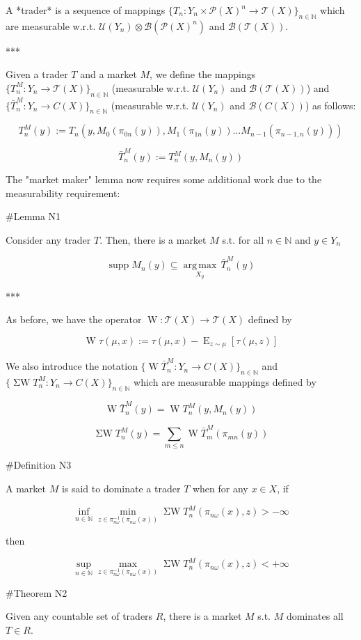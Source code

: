 \documentclass[a4paper]{article}
\DeclareMathOperator{\Supp}{supp}
\DeclareMathOperator{\E}{E}
\newcommand{\Argmax}[1]{\underset{#1}{\operatorname{arg\,max}}\,}
\newcommand{\Nats}{\mathbb{N}}
\newcommand{\Prob}{\mathcal{P}}
\newcommand{\T}{\mathcal{T}}
\newcommand{\B}{\mathcal{B}}
\newcommand{\UM}{\mathcal{U}}
\newcommand{\W}{\operatorname{W}}
\newcommand{\SW}{\operatorname{\Sigma W}}
\begin{document}
A *trader* is a sequence of mappings ${\{T_n: Y_n \times \Prob(X)^n \rightarrow \T(X)\}}_{n \in \Nats}$ which are measurable w.r.t. ${\UM(Y_n) \otimes \B(\Prob(X)^n)}$ and ${\B(\T(X))}$.

***

Given a trader ${T}$ and a market ${M}$, we define the mappings ${\{T^M_n: Y_n \rightarrow \T(X)\}_{n \in \Nats}}$ (measurable w.r.t. ${\UM(Y_n)}$ and ${\B(\T(X))}$) and ${\{\bar{T}^M_n: Y_n \rightarrow C(X)\}_{n \in \Nats}}$ (measurable w.r.t. ${\UM(Y_n)}$ and ${\B(C(X))}$) as follows:

$$T^M_n(y):= T_n(y, M_0(\pi_{0n}(y)),M_1(\pi_{1n}(y)) \ldots M_{n-1}(\pi_{n-1,n}(y)))$$

$$\bar{T}^M_n(y):= T^M_n(y,M_n(y))$$

The "market maker" lemma now requires some additional work due to the measurability requirement:

\#Lemma N1

Consider any trader ${T}$. Then, there is a market ${M}$ s.t. for all ${n \in \Nats}$ and ${y \in Y_n}$

$$\Supp M_n(y) \subseteq \Argmax{X_y} \bar{T}^M_n(y)$$

***

As before, we have the operator ${\W: \T(X) \rightarrow \T(X)}$ defined by 

$$\W \tau(\mu,x):= \tau(\mu,x) - \E_{z \sim \mu}[\tau(\mu,z)]$$

We also introduce the notation ${\{\W \bar{T}^M_n: Y_n \rightarrow C(X)\}_{n \in \Nats}}$ and ${\{\SW T^M_n: Y_n \rightarrow C(X)\}_{n \in \Nats}}$ which are measurable mappings defined by

$$\W \bar{T}^M_n(y) = \W T^M_n(y, M_n(y))$$

$$\SW T^M_n(y) = \sum_{m \leq n} \W \bar{T}^M_m(\pi_{mn}(y))$$

\#Definition N3

A market ${M}$ is said to dominate a trader ${T}$ when for any ${x \in X}$, if

$$\inf_{n \in \Nats} \min_{z \in \pi_{n\omega}^{-1}(\pi_{n\omega}(x))} \SW T^M_n(\pi_{n\omega}(x),z) > -\infty$$

then

$$\sup_{n \in \Nats} \max_{z \in \pi_{n\omega}^{-1}(\pi_{n\omega}(x))} \SW T^M_n(\pi_{n\omega}(x),z) < +\infty$$

\#Theorem N2

Given any countable set of traders $R$, there is a market ${M}$ s.t. ${M}$ dominates all ${T \in R}$.
\end{document}
